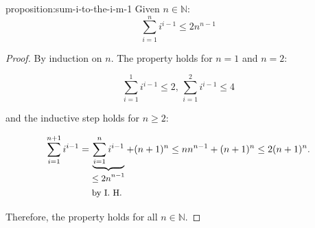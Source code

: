 \documentclass[11pt,a4paper]{tesis}
\theoremstyle{plain}
\theoremstyle{definition}
\begin{document}
\begin{repproposition}{proposition:sum-i-to-the-i-m-1}
  Given $n \in \mathbb{N}$:
  \begin{equation*}
    \sum_{i = 1}^{n} i^{i - 1} \le 2 n^{n - 1}
  \end{equation*}
\end{repproposition}

\begin{proof}
  By induction on $n$. The property holds for $n = 1$ and $n = 2$:

  \begin{equation*}
    \sum_{i = 1}^{1} i^{i - 1} \le 2 \text{, } \sum_{i = 1}^{2} i^{i - 1} \le 4
  \end{equation*}

  and the inductive step holds for $n \ge 2$:
  
  
  \begin{equation*}
    \sum_{i = 1}^{n + 1} i^{i - 1} = \underbrace{\sum_{i = 1}^{n} i^{i - 1}}_{
      {
        \begin{aligned}
          & \text{\small $\le 2 n^{n - 1}$} \\
          & \text{\small by I. H.}
        \end{aligned}
      }%
    } + (n + 1)^{n} \le n n^{n - 1} + (n + 1)^{n} \le 2 (n + 1)^{n} \text{.}
  \end{equation*}

  Therefore, the property holds for all $n \in \mathbb{N}$.
\end{proof}

\backmatter


\end{document}
